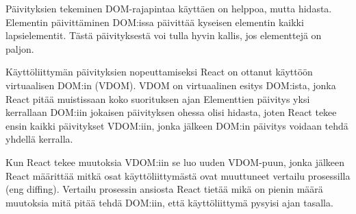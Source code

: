 Päivityksien tekeminen DOM-rajapintaa käyttäen on helppoa, mutta hidasta.
Elementin päivittäminen DOM:issa päivittää kyseisen elementin kaikki lapsielementit. 
Tästä päivityksestä voi tulla hyvin kallis, jos elementtejä on paljon.
\bigskip




Käyttöliittymän päivityksien nopeuttamiseksi React on ottanut käyttöön virtuaalisen DOM:in (VDOM).
VDOM on virtuaalinen esitys DOM:ista, jonka React pitää muistissaan koko suorituksen ajan
Elementtien päivitys yksi kerrallaan DOM:iin jokaisen päivityksen ohessa olisi hidasta,
joten React tekee ensin kaikki päivitykset VDOM:iin, jonka jälkeen DOM:in päivitys voidaan tehdä yhdellä kerralla.
%
%
\medskip

Kun React tekee muutoksia VDOM:iin se luo uuden VDOM-puun, jonka jälkeen
React määrittää mitkä osat käyttöliittymästä ovat muuttuneet vertailu prosessilla (eng diffing).
Vertailu prosessin ansiosta React tietää mikä on pienin määrä muutoksia mitä pitää tehdä DOM:iin, 
että käyttöliittymä pysyisi ajan tasalla.
\medskip



